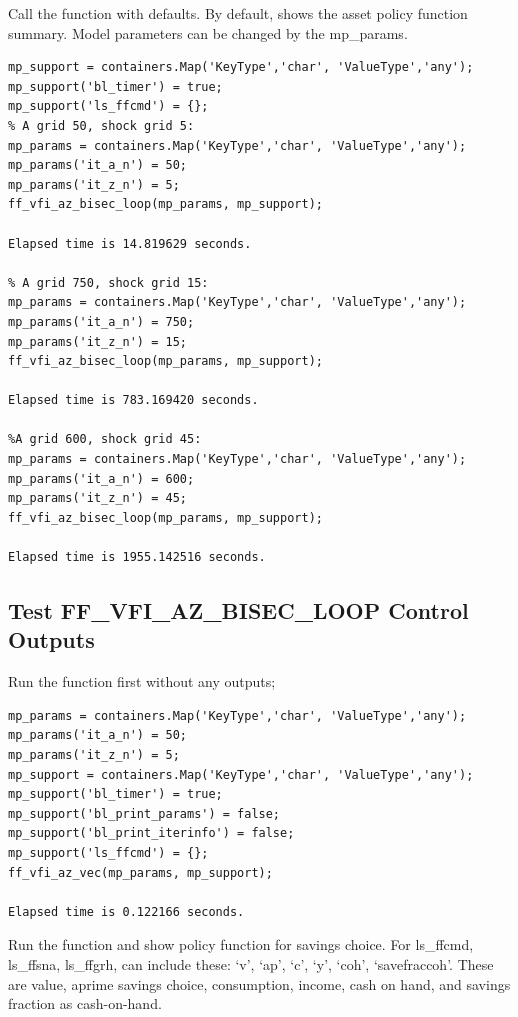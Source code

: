 \documentclass[
]{book}
\begin{document}
Call the function with defaults. By default, shows the asset policy
function summary. Model parameters can be changed by the mp\_params.

\begin{verbatim}
mp_support = containers.Map('KeyType','char', 'ValueType','any');
mp_support('bl_timer') = true;
mp_support('ls_ffcmd') = {};
% A grid 50, shock grid 5:
mp_params = containers.Map('KeyType','char', 'ValueType','any');
mp_params('it_a_n') = 50;
mp_params('it_z_n') = 5;
ff_vfi_az_bisec_loop(mp_params, mp_support);

Elapsed time is 14.819629 seconds.

% A grid 750, shock grid 15:
mp_params = containers.Map('KeyType','char', 'ValueType','any');
mp_params('it_a_n') = 750;
mp_params('it_z_n') = 15;
ff_vfi_az_bisec_loop(mp_params, mp_support);

Elapsed time is 783.169420 seconds.

%A grid 600, shock grid 45:
mp_params = containers.Map('KeyType','char', 'ValueType','any');
mp_params('it_a_n') = 600;
mp_params('it_z_n') = 45;
ff_vfi_az_bisec_loop(mp_params, mp_support);

Elapsed time is 1955.142516 seconds.
\end{verbatim}

\hypertarget{test-ff_vfi_az_bisec_loop-control-outputs}{%
\subsection{Test FF\_VFI\_AZ\_BISEC\_LOOP Control Outputs}\label{test-ff_vfi_az_bisec_loop-control-outputs}}

Run the function first without any outputs;

\begin{verbatim}
mp_params = containers.Map('KeyType','char', 'ValueType','any');
mp_params('it_a_n') = 50;
mp_params('it_z_n') = 5;
mp_support = containers.Map('KeyType','char', 'ValueType','any');
mp_support('bl_timer') = true;
mp_support('bl_print_params') = false;
mp_support('bl_print_iterinfo') = false;
mp_support('ls_ffcmd') = {};
ff_vfi_az_vec(mp_params, mp_support);

Elapsed time is 0.122166 seconds.
\end{verbatim}

Run the function and show policy function for savings choice. For
ls\_ffcmd, ls\_ffsna, ls\_ffgrh, can include these: `v', `ap', `c', `y',
`coh', `savefraccoh'. These are value, aprime savings choice,
consumption, income, cash on hand, and savings fraction as cash-on-hand.
\end{document}
